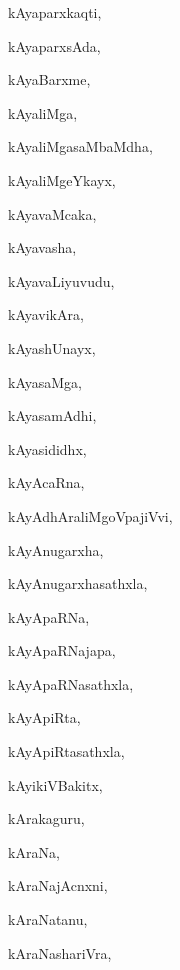 \begin{multicols}{3}
{\noindent
{kAyaparxkaqti}, \pageref{kAyaparxkaqti}

\noindent
{kAyaparxsAda}, \pageref{kAyaparxsAda}

\noindent
{kAyaBarxme}, \pageref{kAyaBarxme}

\noindent
{kAyaliMga}, \pageref{kAyaliMga}

\noindent
{kAyaliMgasaMbaMdha}, \pageref{kAyaliMgasaMbaMdha}

\noindent
{kAyaliMgeYkayx}, \pageref{kAyaliMgeYkayx}

\noindent
{kAyavaMcaka}, \pageref{kAyavaMcaka}

\noindent
{kAyavasha}, \pageref{kAyavasha}

\noindent
{kAyavaLiyuvudu}, \pageref{kAyavaLiyuvudu}

\noindent
{kAyavikAra}, \pageref{kAyavikAra}

\noindent
{kAyashUnayx}, \pageref{kAyashUnayx}

\noindent
{kAyasaMga}, \pageref{kAyasaMga}

\noindent
{kAyasamAdhi}, \pageref{kAyasamAdhi}

\noindent
{kAyasididhx}, \pageref{kAyasididhx}

\noindent
{kAyAcaRna}, \pageref{kAyAcaRna}

\noindent
{kAyAdhAraliMgoVpajiVvi}, \pageref{kAyAdhAraliMgoVpajiVvi}

\noindent
{kAyAnugarxha}, \pageref{kAyAnugarxha}

\noindent
{kAyAnugarxhasathxla}, \pageref{kAyAnugarxhasathxla}

\noindent
{kAyApaRNa}, \pageref{kAyApaRNa}

\noindent
{kAyApaRNajapa}, \pageref{kAyApaRNajapa}

\noindent
{kAyApaRNasathxla}, \pageref{kAyApaRNasathxla}

\noindent
{kAyApiRta}, \pageref{kAyApiRta}

\noindent
{kAyApiRtasathxla}, \pageref{kAyApiRtasathxla}

\noindent
{kAyikiVBakitx}, \pageref{kAyikiVBakitx}

\noindent
{kArakaguru}, \pageref{kArakaguru}

\noindent
{kAraNa}, \pageref{kAraNa}

\noindent
{kAraNajAcnxni}, \pageref{kAraNajAcnxni}

\noindent
{kAraNatanu}, \pageref{kAraNatanu}

\noindent
{kAraNashariVra}, \pageref{kAraNashariVra}

}
\end{multicols}
